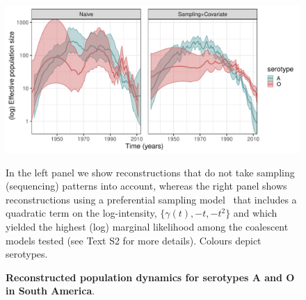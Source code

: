 \documentclass[10pt]{article}
\begin{document}
\begin{figure}[!ht]
\begin{center}
\includegraphics[scale=0.54]{FIGURES/PLOTS/population_size_reconstructions_full.pdf}
\end{center}
\caption{\textbf{Reconstructed population dynamics for serotypes A and O in South America}.
}
In the left panel we show reconstructions that do not take sampling (sequencing) patterns into account, whereas the right panel shows reconstructions using a preferential sampling model~\citep{Karcher2020} that includes a quadratic term on the log-intensity, $\{\gamma(t), -t, -t^2\}$ and which yielded the highest (log) marginal likelihood among the coalescent models tested (see Text S2 for more details).
Colours depict serotypes.

\label{fig:popdyn}
\end{figure}
\end{document}
